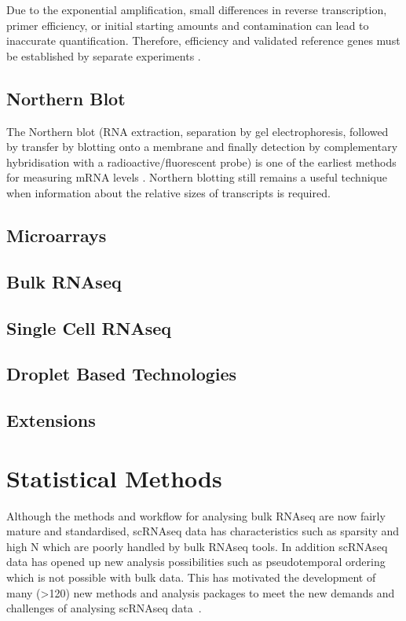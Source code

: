 Due to the exponential amplification, small differences in reverse transcription, primer efficiency, or initial starting amounts and contamination can lead to inaccurate quantification. Therefore, efficiency and validated reference genes must be established by separate experiments \parencite{Bustin2009MIQE}.

\subsection{Northern Blot}
The Northern blot (RNA extraction, separation by gel electrophoresis, followed by transfer by blotting onto a membrane and finally detection by complementary hybridisation with a radioactive/fluorescent probe)  is one of the earliest methods for measuring mRNA levels \parencite{Alwine1977Method}. Northern blotting still remains a useful technique when information about the relative sizes of transcripts is required.

\subsection{Microarrays}


\subsection{Bulk RNAseq}


\subsection{Single Cell RNAseq}


\subsection{Droplet Based Technologies}


\subsection{Extensions}


\section{Statistical Methods}

Although the methods and workflow for analysing bulk RNAseq are now fairly mature and standardised, scRNAseq data has characteristics such as sparsity and high N which are poorly handled by bulk RNAseq tools. In addition scRNAseq data has opened up new analysis possibilities such as pseudotemporal ordering which is not possible with bulk data. This has motivated the development of many (\textgreater 120) new methods and analysis packages to meet the new demands and challenges of analysing scRNAseq data~\cite{Zappia2017scRNAtools}.

